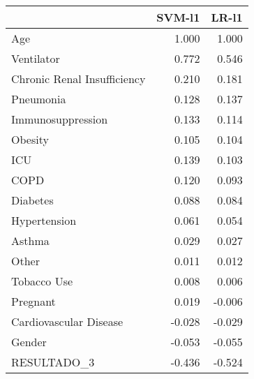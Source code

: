 \begin{tabular}{lrr}
\toprule
{} &  SVM-l1 &  LR-l1 \\
\midrule
Age                         &   1.000 &  1.000 \\
Ventilator                  &   0.772 &  0.546 \\
Chronic Renal Insufficiency &   0.210 &  0.181 \\
Pneumonia                   &   0.128 &  0.137 \\
Immunosuppression           &   0.133 &  0.114 \\
Obesity                     &   0.105 &  0.104 \\
ICU                         &   0.139 &  0.103 \\
COPD                        &   0.120 &  0.093 \\
Diabetes                    &   0.088 &  0.084 \\
Hypertension                &   0.061 &  0.054 \\
Asthma                      &   0.029 &  0.027 \\
Other                       &   0.011 &  0.012 \\
Tobacco Use                 &   0.008 &  0.006 \\
Pregnant                    &   0.019 & -0.006 \\
Cardiovascular Disease      &  -0.028 & -0.029 \\
Gender                      &  -0.053 & -0.055 \\
RESULTADO\_3                 &  -0.436 & -0.524 \\
\bottomrule
\end{tabular}
